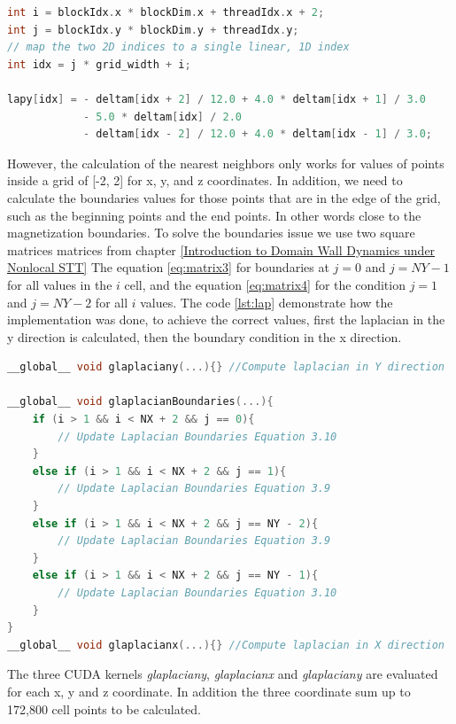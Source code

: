 \begin{lstlisting}[language=C++, label={lst:lpay}, caption={Laplacian X using global memory}]
int i = blockIdx.x * blockDim.x + threadIdx.x + 2;
int j = blockIdx.y * blockDim.y + threadIdx.y;
// map the two 2D indices to a single linear, 1D index
int idx = j * grid_width + i;

lapy[idx] = - deltam[idx + 2] / 12.0 + 4.0 * deltam[idx + 1] / 3.0
			- 5.0 * deltam[idx] / 2.0
			- deltam[idx - 2] / 12.0 + 4.0 * deltam[idx - 1] / 3.0;	
\end{lstlisting}


However, the calculation of the nearest neighbors only works for values of points inside a grid of [-2, 2] for x, y, and z coordinates. In addition, we need to calculate the boundaries values for those points that are in the edge of the grid, such as the beginning points and the end points. In other words close to the magnetization boundaries. To solve the boundaries issue we use two square matrices matrices from chapter \ref{Introduction to Domain Wall Dynamics under Nonlocal STT}  The equation \ref{eq:matrix3} for boundaries at $j = 0$ and $j = NY - 1$ for all values in the $i$ cell, and the equation \ref{eq:matrix4} for the condition $j = 1$ and $j = NY - 2$ for all $i$ values. The code \ref{lst:lap} demonstrate how the implementation was done, to achieve the correct values, first the laplacian in the y direction is calculated, then the boundary condition in the x direction. 

\begin{lstlisting}[language=C++, label={lst:lap}, caption={Evaluation of Laplacian X, Y with boundary condition}]
__global__ void glaplaciany(...){} //Compute laplacian in Y direction

__global__ void glaplacianBoundaries(...){
    if (i > 1 && i < NX + 2 && j == 0){
     	// Update Laplacian Boundaries Equation 3.10
    }
    else if (i > 1 && i < NX + 2 && j == 1){
  		// Update Laplacian Boundaries Equation 3.9
    }
    else if (i > 1 && i < NX + 2 && j == NY - 2){
        // Update Laplacian Boundaries Equation 3.9
    }
    else if (i > 1 && i < NX + 2 && j == NY - 1){
        // Update Laplacian Boundaries Equation 3.10
    }
}
__global__ void glaplacianx(...){} //Compute laplacian in X direction
\end{lstlisting}

The three CUDA kernels \textit{glaplaciany}, \textit{glaplacianx} and \textit{glaplaciany} are evaluated for each x, y and z coordinate. In addition the three coordinate sum up to 172,800 cell points to be calculated.


